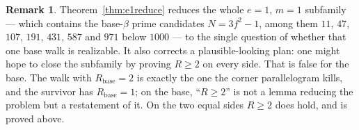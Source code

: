 \documentclass[11pt,reqno]{amsart}
\theoremstyle{plain}
\theoremstyle{definition}
\newtheorem{remark}[theorem]{Remark}
\begin{document}
\begin{remark}\label{rem:e1status}
Theorem~\ref{thm:e1reduce} reduces the whole $e=1$, $m=1$ subfamily --- which contains the base-$\beta$
prime candidates $N=3f^2-1$, among them $11$, $47$, $107$, $191$, $431$, $587$ and $971$ below
$1000$ --- to the single question of whether that one base walk is realizable. It also corrects a
plausible-looking plan: one might hope to close the subfamily by proving $R\ge2$ on every side. That
is false for the base. The walk with $R_{\mathrm{base}}=2$ is exactly the one the corner
parallelogram kills, and the survivor has $R_{\mathrm{base}}=1$; on the base, ``$R\ge2$'' is not a
lemma reducing the problem but a restatement of it. On the two equal sides $R\ge2$ does hold, and is
proved above.
\end{remark}
\end{document}
